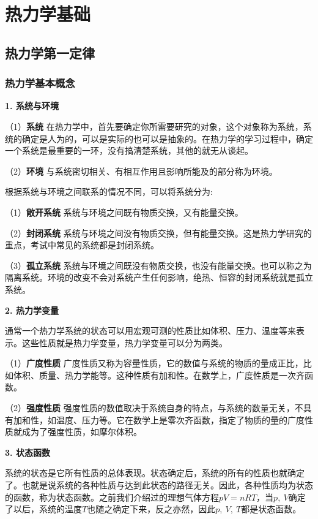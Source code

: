 \documentclass[lang=cn,newtx,11pt,scheme=chinese]{elegantbook}
\begin{document}
\chapter{热力学基础}
\section{热力学第一定律}
\subsection{热力学基本概念}
\textbf{1. 系统与环境}

（1）\textbf{系统} \quad 在热力学中，首先要确定你所需要研究的对象，这个对象称为系统，系统的确定是人为的，可以是实际的也可以是抽象的。在热力学的学习过程中，确定一个系统是最重要的一环，没有搞清楚系统，其他的就无从谈起。

（2）\textbf{环境} \quad 与系统密切相关、有相互作用且影响所能及的部分称为环境。

根据系统与环境之间联系的情况不同，可以将系统分为:

（1）\textbf{敞开系统} \quad 系统与环境之间既有物质交换，又有能量交换。

（2）\textbf{封闭系统} \quad 系统与环境之间没有物质交换，但有能量交换。这是热力学研究的重点，考试中常见的系统都是封闭系统。

（3）\textbf{孤立系统} \quad 系统与环境之间既没有物质交换，也没有能量交换。也可以称之为隔离系统。环境的改变不会对系统产生任何影响，绝热、恒容的封闭系统就是孤立系统。

\textbf{2. 热力学变量}

通常一个热力学系统的状态可以用宏观可测的性质比如体积、压力、温度等来表示。这些性质就是热力学变量，热力学变量可以分为两类。

（1）\textbf{广度性质} \quad 广度性质又称为容量性质，它的数值与系统的物质的量成正比，比如体积、质量、热力学能等。这种性质有加和性。在数学上，广度性质是一次齐函数。

（2）\textbf{强度性质} \quad 强度性质的数值取决于系统自身的特点，与系统的数量无关，不具有加和性，如温度、压力等。它在数学上是零次齐函数，指定了物质的量的广度性质就成为了强度性质，如摩尔体积。

\textbf{3. 状态函数}

系统的状态是它所有性质的总体表现。状态确定后，系统的所有的性质也就确定了。也就是说系统的各种性质与达到此状态的路径无关。因此，各种性质均为状态的函数，称为状态函数。之前我们介绍过的理想气体方程$pV=nRT$，当$p, \ V$确定了以后，系统的温度$T$也随之确定下来，反之亦然，因此$p, \ V, \ T$都是状态函数。
\end{document}
